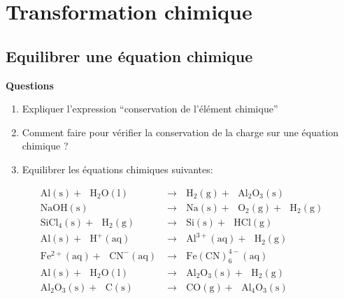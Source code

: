 \documentclass[
]{book}
\providecommand{\tightlist}{%
  \setlength{\itemsep}{0pt}\setlength{\parskip}{0pt}}
\def\tightlist{}
\begin{document}
\hypertarget{transformation-chimique}{%
\section{Transformation chimique}\label{transformation-chimique}}

\hypertarget{equilibrer-une-uxe9quation-chimique}{%
\subsection{Equilibrer une équation chimique}\label{equilibrer-une-uxe9quation-chimique}}

\begin{blackbox}

\begin{center}
\textbf{Questions}

\end{center}

\begin{enumerate}
\def\labelenumi{\arabic{enumi}.}
\tightlist
\item
  Expliquer l'expression ``conservation de l'élément chimique''
\item
  Comment faire pour vérifier la conservation de la charge sur une équation chimique ?
\item
  Equilibrer les équations chimiques suivantes:
\end{enumerate}

\begin{align}
\mathrm{Al(s)+\ \ \ H_2O(l)}&\longrightarrow \ \ \ \mathrm{H_2(g)+ \ \ \ Al_2O_3(s)}\\
\mathrm{NaOH(s)}&\longrightarrow \ \ \ \mathrm{Na(s)+\ \ \ O_2(g)+\ \ \ H_2(g)}\\
\mathrm{SiCl_4(s)+\ \ \ H_2(g)}&\longrightarrow \ \ \ \mathrm{ Si(s)+\ \ \ HCl(g)}\\
\mathrm{Al(s)+\ \ \ H^+(aq)}&\longrightarrow \ \ \ \mathrm{Al^{3+}(aq)+\ \ \ H_2(g)}\\
\mathrm{Fe^{2+}(aq)+\ \ \ CN^-(aq)}&\longrightarrow \ \ \ \mathrm{Fe(CN)_6^{4-}(aq)}\\
\mathrm{Al(s)+\ \ \ H_2O(l)}&\longrightarrow \ \ \ \mathrm{Al_2O_3(s)+\ \ \ H_2(g)}\\
\mathrm{Al_2O_3(s)+\ \ \ C(s)}&\longrightarrow \ \ \ \mathrm{CO(g)+\ \ \ Al_4O_3(s)}
\end{align}

\end{blackbox}
\end{document}
